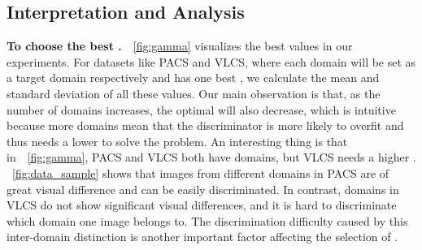 \documentclass{article} \usepackage{iclr2023_conference,times}
\newcommand{\abbr}[0]{DANN+ELS\xspace}
\begin{document}
\begin{figure*}[htb]
\centering
\vspace{-0.2cm}
\centering
\vspace{-0.2cm}
\caption{(a) Generalization performance of \abbr compared to DANN with partial correct environment label on the PACS dataset ( as target domain). (b) {The best  for each dataset.} Civil is the CivilComments dataset and OGB is the OGB-MolPCBA dataset. (c) Average generalization accuracy on the PACS dataset with different smoothing policies.} 
\vspace{-0.2cm}
\end{figure*}
\vspace{-0.1cm}
\subsection{Interpretation and Analysis}
\vspace{-0.1cm}
\noindent\textbf{To choose the best .}~\figurename~\ref{fig:gamma} visualizes the best  values in our experiments. For datasets like PACS and VLCS, where each domain will be set as a target domain respectively and has one best , we calculate the mean and standard deviation of all these  values. Our main observation is that, as the number of domains increases, the optimal  will also decrease, which is intuitive because more domains mean that the discriminator is more likely to overfit and thus needs a lower  to solve the problem. An interesting thing is that in~\figurename~\ref{fig:gamma}, PACS and VLCS both have  domains, but VLCS needs a higher . \figurename~\ref{fig:data_sample} shows that images from different domains in PACS are of great visual difference and can be easily discriminated. In contrast, domains in VLCS do not show significant visual differences, and it is hard to discriminate which domain one image belongs to. The discrimination difficulty caused by this inter-domain distinction is another important factor affecting the selection of .
\end{document}
